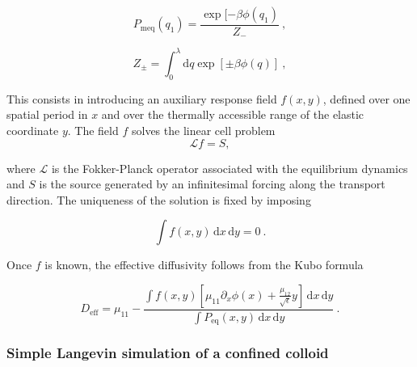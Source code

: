 \begin{equation}
    P_\mathrm{meq} (q_1) = \frac{\exp[-\beta \phi(q_1)}{Z_-}~,
\end{equation}

\begin{equation}
    Z_\pm = \int_{0}^{\lambda} \mathrm{d}q \exp [\pm \beta \phi(q)]~,
\end{equation}






This consists in introducing an auxiliary response field $f(x,y)$, defined over one spatial period in $x$ and over the thermally accessible range of the elastic coordinate $y$. The field $f$ solves the linear cell problem
\begin{equation}
    \mathcal{L} f = S,
    \label{Kubo_cellproblem}
\end{equation}

where $\mathcal{L}$ is the Fokker-Planck operator associated with the equilibrium dynamics and $S$ is the source generated by an infinitesimal forcing along the transport direction. The uniqueness of the solution is fixed by imposing

\begin{equation}
    \int f(x,y)\,\mathrm{d}x \,\mathrm{d}y = 0~.
    \label{jubo_boundary}
\end{equation}

Once $f$ is known, the effective diffusivity follows from the Kubo formula

\begin{equation}
    D_{\mathrm{eff}} = \mu_{11} - \frac{ \int f(x,y) \left[ \mu_{11}\partial_x\phi(x) + \frac{\mu_{12}}{\sqrt{\epsilon}}y \right] \, \mathrm{d}x \, \mathrm{d}y
}{\int P_{\mathrm{eq}}(x,y)\,\mathrm{d}x\,\mathrm{d}y}~.
\label{Kubo_final}
\end{equation}


\subsubsection{Simple Langevin simulation of a confined colloid}

